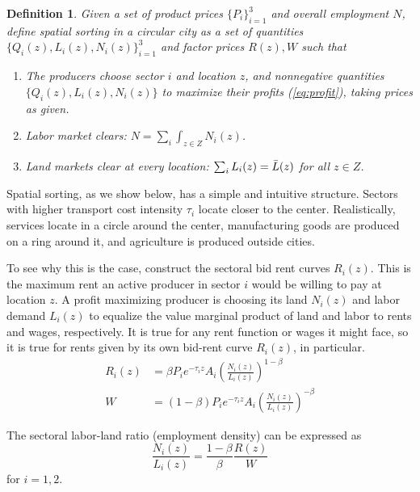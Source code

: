 \documentclass[12pt]{article}
\newtheorem{definition}{Definition}
\begin{document}
\begin{definition}
Given a set of product prices $\{P_i\}_{i=1}^3$ and overall employment $N$, define \emph{spatial sorting} in a circular city as a set of quantities $\{Q_i(z), L_i(z), N_i(z)\}_{i=1}^3$ and factor prices $R(z), W$ such that
\begin{enumerate}
    \item The producers choose sector $i$ and location $z$, and nonnegative quantities $\{Q_i(z), L_i(z), N_i(z)\}$ to maximize their profits (\ref{eq:profit}), taking prices as given.
    \item Labor market clears: $N=\sum_i\int_{z\in Z} N_i(z)$.
    \item Land markets clear at every location: $\sum_iL_i(z)=\Bar L(z)$ for all $z\in Z$.
\end{enumerate}
\end{definition}
Spatial sorting, as we show below, has a simple and intuitive structure. Sectors with higher transport cost intensity $\tau_i$ locate closer to the center. Realistically, services locate in a circle around the center, manufacturing goods are produced on a ring around it, and agriculture is produced outside cities.

To see why this is the case, construct the sectoral bid rent curves $R_i(z)$. This is the maximum rent an active producer in sector $i$ would be willing to pay at location $z$. %
A profit maximizing producer is choosing its land $N_i(z)$ and labor demand $L_i(z)$ to equalize the value marginal product of land and labor to rents and wages, respectively. It is true for any rent function or wages it might face, so it is true for rents given by its own bid-rent curve $R_i(z)$, in particular.
\begin{align}
R_i(z) &=\beta P_ie^{-\tau_i z}A_i \left(\frac{N_i(z)}{L_i(z)}\right)^{1-\beta}\\
W &=(1-\beta) P_ie^{-\tau_i z}A_i \left(\frac{N_i(z)}{L_i(z)}\right)^{-\beta}
\end{align}

The sectoral labor-land ratio (employment density) can be expressed as
\begin{equation}
\label{eq:EmpDens}
\frac{N_i(z)}{L_i(z)} = \frac{1-\beta}{\beta}\frac{R(z)}{W}
\end{equation}
for $i=1,2$.
\end{document}
